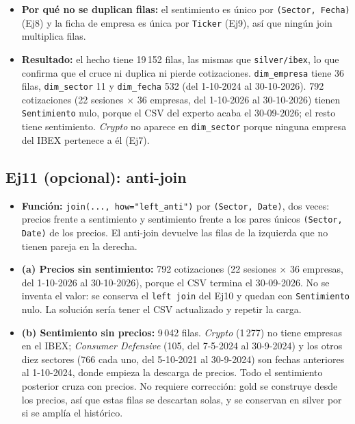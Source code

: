 \documentclass[11pt,a4paper]{article}
\newcommand{\code}[1]{\texttt{#1}}
\begin{document}
\begin{itemize}
    \item \textbf{Por qué no se duplican filas:} el sentimiento es único por \code{(Sector, Fecha)} (Ej8) y la ficha de empresa es única por \code{Ticker} (Ej9), así que ningún join multiplica filas.
    \item \textbf{Resultado:} el hecho tiene 19\,152 filas, las mismas que \code{silver/ibex}, lo que confirma que el cruce ni duplica ni pierde cotizaciones. \code{dim\_empresa} tiene 36 filas, \code{dim\_sector} 11 y \code{dim\_fecha} 532 (del 1-10-2024 al 30-10-2026). 792 cotizaciones (22 sesiones $\times$ 36 empresas, del 1-10-2026 al 30-10-2026) tienen \code{Sentimiento} nulo, porque el CSV del experto acaba el 30-09-2026; el resto tiene sentimiento. \textit{Crypto} no aparece en \code{dim\_sector} porque ninguna empresa del IBEX pertenece a él (Ej7).
\end{itemize}

\subsection*{Ej11 (opcional): anti-join}
\begin{itemize}
    \item \textbf{Función:} \code{join(..., how="left\_anti")} por \code{(Sector, Date)}, dos veces: precios frente a sentimiento y sentimiento frente a los pares únicos \code{(Sector, Date)} de los precios. El anti-join devuelve las filas de la izquierda que no tienen pareja en la derecha.
    \item \textbf{(a) Precios sin sentimiento:} 792 cotizaciones (22 sesiones $\times$ 36 empresas, del 1-10-2026 al 30-10-2026), porque el CSV termina el 30-09-2026. No se inventa el valor: se conserva el \code{left join} del Ej10 y quedan con \code{Sentimiento} nulo. La solución sería tener el CSV actualizado y repetir la carga.
    \item \textbf{(b) Sentimiento sin precios:} 9\,042 filas. \textit{Crypto} (1\,277) no tiene empresas en el IBEX; \textit{Consumer Defensive} (105, del 7-5-2024 al 30-9-2024) y los otros diez sectores (766 cada uno, del 5-10-2021 al 30-9-2024) son fechas anteriores al 1-10-2024, donde empieza la descarga de precios. Todo el sentimiento posterior cruza con precios. No requiere corrección: gold se construye desde los precios, así que estas filas se descartan solas, y se conservan en silver por si se amplía el histórico.
\end{itemize}
\end{document}
